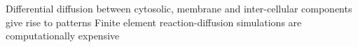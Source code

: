 \documentclass[a0,portrait]{a0poster}
\begin{document}
\begin{itemize}[leftmargin=5cm]
	\up Differential diffusion between cytosolic, membrane and inter-cellular components give rise to patterns
	\down Finite element reaction-diffusion simulations are computationally expensive
\end{itemize}


\vfill\normalsize

\begin{minipage}[t][][b]{0.99\textwidth}
	
	
\end{minipage}
\end{document}
